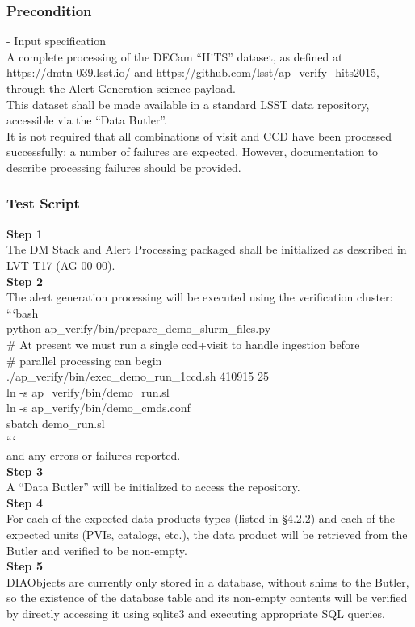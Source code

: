 \subsubsection{Precondition}\label{precondition-1}

- Input specification\\[2\baselineskip]A complete processing of the
DECam ``HiTS'' dataset, as defined at https://dmtn-039.lsst.io/ and
https://github.com/lsst/ap\_verify\_hits2015, through the Alert
Generation science payload.\\
This dataset shall be made available in a standard LSST data repository,
accessible via the ``Data Butler''.\\
It is not required that all combinations of visit and CCD have been
processed successfully: a number of failures are expected. However,
documentation to describe processing failures should be provided.

\subsubsection{Test Script}\label{test-script-1}

\textbf{Step 1}\\
The DM Stack and Alert Processing packaged shall be initialized as
described in LVT-T17 (AG-00-00).\\[2\baselineskip]\textbf{Step 2}\\
The alert generation processing will be executed using the verification
cluster:\\[2\baselineskip]```bash\\
python ap\_verify/bin/prepare\_demo\_slurm\_files.py\\
\# At present we must run a single ccd+visit to handle ingestion
before\\
\# parallel processing can begin\\
./ap\_verify/bin/exec\_demo\_run\_1ccd.sh 410915 25\\
ln -s ap\_verify/bin/demo\_run.sl\\
ln -s ap\_verify/bin/demo\_cmds.conf\\
sbatch demo\_run.sl\\
```\\[2\baselineskip]and any errors or failures
reported.\\[2\baselineskip]\textbf{Step 3}\\
A ``Data Butler'' will be initialized to access the
repository.\\[2\baselineskip]\textbf{Step 4}\\
For each of the expected data products types (listed in §4.2.2) and each
of the expected units (PVIs, catalogs, etc.), the data product will be
retrieved from the Butler and verified to be
non-empty.\\[2\baselineskip]\textbf{Step 5}\\
DIAObjects are currently only stored in a database, without shims to the
Butler, so the existence of the database table and its non-empty
contents will be verified by directly accessing it using sqlite3 and
executing appropriate SQL queries.\\[2\baselineskip]

